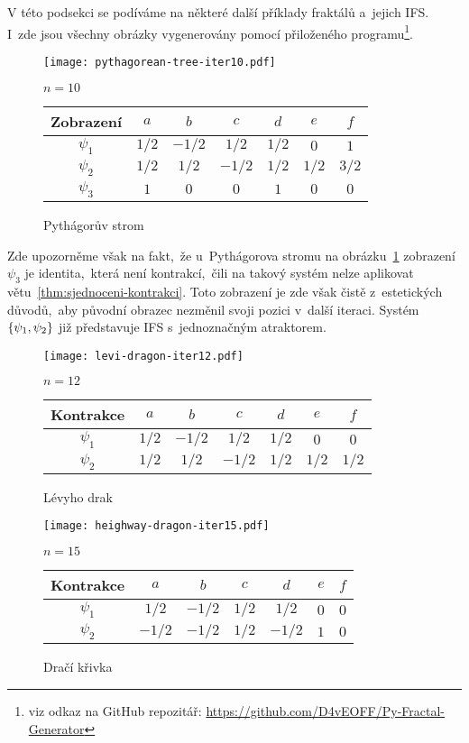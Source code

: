 V této podsekci se podíváme na některé další příklady fraktálů a~jejich IFS. I~zde jsou všechny obrázky vygenerovány pomocí přiloženého programu\footnote{viz odkaz na GitHub repozitář: \url{https://github.com/D4vEOFF/Py-Fractal-Generator}}.
\begin{figure}[H]
    \centering
    \texttt{[image: pythagorean-tree-iter10.pdf]}
    \begin{center}
        $n=10$
    \end{center}
    \begin{tabular}{c|cccccc}
    Zobrazení   & $a$   & $b$   & $c$   & $d$   & $e$   & $f$          \\\hline
    $\psi_1$    & $1/2$ & $-1/2$ & $1/2$ & $1/2$ & $0$   & $1$         \\
    $\psi_2$    & $1/2$ & $1/2$ & $-1/2$ & $1/2$ & $1/2$ & $3/2$         \\
    $\psi_3$    & $1$   & $0$   & $0$   & $1$   & $0$   & $0$         \\
    \end{tabular}
    \caption{Pythágorův strom}
    \label{fig:pythagoruv-strom}
\end{figure}
Zde upozorněme však na fakt,~že u~Pythágorova stromu na obrázku~\ref{fig:pythagoruv-strom} zobrazení $\psi_3$ je identita,~která není kontrakcí,~čili na takový systém nelze aplikovat větu~\ref{thm:sjednoceni-kontrakci}. Toto zobrazení je zde však čistě z~estetických důvodů,~aby původní obrazec nezměnil svoji pozici v~další iteraci. Systém $\left\{\psi_1,\psi_2\right\}$ již představuje IFS s~jednoznačným atraktorem.
\begin{figure}[H]
    \centering
    \texttt{[image: levi-dragon-iter12.pdf]}
    \begin{center}
        $n=12$
    \end{center}
    \begin{tabular}{c|cccccc}
    Kontrakce   & $a$   & $b$   & $c$   & $d$   & $e$   & $f$          \\\hline
    $\psi_1$    & $1/2$ & $-1/2$ & $1/2$ & $1/2$ & $0$   & $0$         \\
    $\psi_2$    & $1/2$ & $1/2$ & $-1/2$ & $1/2$ & $1/2$ & $1/2$
    \end{tabular}
    \caption{Lévyho drak}
    \label{fig:levyho-drak}
\end{figure}
\begin{figure}[H]
    \centering
    \texttt{[image: heighway-dragon-iter15.pdf]}
    \begin{center}
        $n=15$
    \end{center}
    \begin{tabular}{c|cccccc}
    Kontrakce   & $a$   & $b$   & $c$   & $d$   & $e$   & $f$          \\\hline
    $\psi_1$    & $1/2$ & $-1/2$ & $1/2$ & $1/2$ & $0$   & $0$         \\
    $\psi_2$    & $-1/2$ & $-1/2$ & $1/2$ & $-1/2$ & $1$ & $0$
    \end{tabular}
    \caption{Dračí křivka}
    \label{fig:draci-krivka}
\end{figure}
